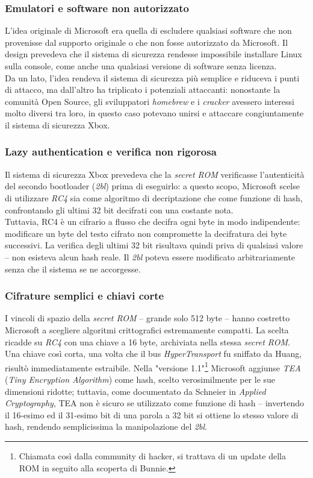 \subsubsection{Emulatori e software non autorizzato}
L'idea originale di Microsoft era quella di escludere qualsiasi software che non provenisse dal supporto originale o che non fosse autorizzato da Microsoft. Il design prevedeva che il sistema di sicurezza rendesse impossibile installare Linux sulla console, come anche una qualsiasi versione di software senza licenza.\\
Da un lato, l'idea rendeva il sistema di sicurezza più semplice e riduceva i punti di attacco, ma dall'altro ha triplicato i potenziali attaccanti: nonostante la comunità Open Source, gli sviluppatori \textit{homebrew} e i \textit{cracker} avessero interessi molto diversi tra loro, in questo caso potevano unirsi e attaccare congiuntamente il sistema di sicurezza Xbox.
\subsubsection{Lazy authentication e verifica non rigorosa}
Il sistema di sicurezza Xbox prevedeva che la \textit{secret ROM} verificasse l'autenticità del secondo bootloader (\textit{2bl}) prima di eseguirlo: a questo scopo, Microsoft scelse di utilizzare \textit{RC4} sia come algoritmo di decriptazione che come funzione di hash, confrontando gli ultimi 32 bit decifrati con una costante nota.\\
Tuttavia, RC4 è un cifrario a flusso che decifra ogni byte in modo indipendente: modificare un byte del testo cifrato non compromette la decifratura dei byte successivi. La verifica degli ultimi 32 bit risultava quindi priva di qualsiasi valore -- non esisteva alcun hash reale. Il \textit{2bl} poteva essere modificato arbitrariamente senza che il sistema se ne accorgesse.
\subsubsection{Cifrature semplici e chiavi corte}
I vincoli di spazio della \textit{secret ROM} -- grande solo 512 byte -- hanno costretto Microsoft a scegliere algoritmi crittografici estremamente compatti. La scelta ricadde su \textit{RC4} con una chiave a 16 byte, archiviata nella stessa \textit{secret ROM}.\\
Una chiave così corta, una volta che il bus \textit{HyperTransport} fu sniffato da Huang, risultò immediatamente estraibile. Nella "versione 1.1"\footnote{Chiamata così dalla community di hacker, si trattava di un update della ROM in seguito alla scoperta di Bunnie.} Microsoft aggiunse \textit{TEA} (\textit{Tiny Encryption Algorithm}) come hash, scelto verosimilmente per le sue dimensioni ridotte; tuttavia, come documentato da Schneier in \textit{Applied Cryptography}, TEA non è sicuro se 
utilizzato come funzione di hash -- invertendo il 16-esimo ed il 31-esimo bit di una parola a 32 bit si ottiene lo stesso valore di hash, rendendo semplicissima la manipolazione del \textit{2bl}.

